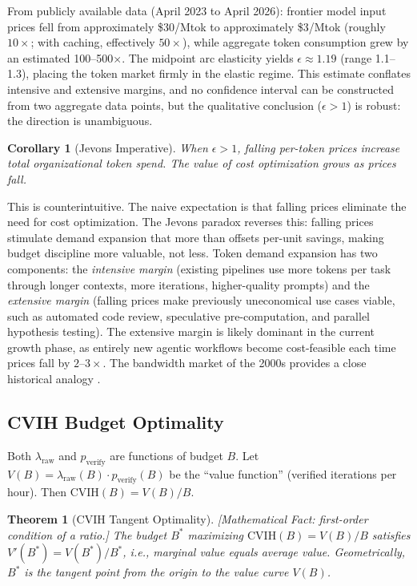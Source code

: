 \documentclass[11pt, a4paper]{googledeepmind}
\newtheorem{theorem}{Theorem}[section]
\newtheorem{corollary}{Corollary}[section]
\begin{document}
From publicly available data (April 2023 to April 2026): frontier model input prices fell from approximately \$30/Mtok to approximately \$3/Mtok (roughly $10\times$; with caching, effectively $50\times$), while aggregate token consumption grew by an estimated 100--500$\times$. The midpoint arc elasticity yields $\epsilon \approx 1.19$ (range 1.1--1.3), placing the token market firmly in the elastic regime. This estimate conflates intensive and extensive margins, and no confidence interval can be constructed from two aggregate data points, but the qualitative conclusion ($\epsilon > 1$) is robust: the direction is unambiguous.

\begin{corollary}[Jevons Imperative]
\label{cor:econ-jevons}
When $\epsilon > 1$, falling per-token prices \emph{increase} total organizational token spend. The value of cost optimization grows as prices fall.
\end{corollary}

This is counterintuitive. The naive expectation is that falling prices eliminate the need for cost optimization. The Jevons paradox reverses this: falling prices stimulate demand expansion that more than offsets per-unit savings, making budget discipline more valuable, not less. Token demand expansion has two components: the \emph{intensive margin} (existing pipelines use more tokens per task through longer contexts, more iterations, higher-quality prompts) and the \emph{extensive margin} (falling prices make previously uneconomical use cases viable, such as automated code review, speculative pre-computation, and parallel hypothesis testing). The extensive margin is likely dominant in the current growth phase, as entirely new agentic workflows become cost-feasible each time prices fall by $2$--$3\times$. The bandwidth market of the 2000s provides a close historical analogy \citep{sorrell2009}.

\subsection{CVIH Budget Optimality}

Both $\lambda_{\text{raw}}$ and $p_{\text{verify}}$ are functions of budget $B$. Let $V(B) = \lambda_{\text{raw}}(B) \cdot p_{\text{verify}}(B)$ be the ``value function'' (verified iterations per hour). Then $\text{CVIH}(B) = V(B)/B$.

\begin{theorem}[CVIH Tangent Optimality]
\label{thm:econ-cvih-tangent}
\emph{[Mathematical Fact: first-order condition of a ratio.]}
The budget $B^*$ maximizing $\text{CVIH}(B) = V(B)/B$ satisfies $V'(B^*) = V(B^*)/B^*$, i.e., marginal value equals average value. Geometrically, $B^*$ is the tangent point from the origin to the value curve $V(B)$.
\end{theorem}
\end{document}
